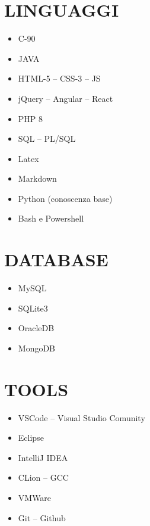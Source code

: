\documentclass{clean_cv}
\begin{document}
    \section{LINGUAGGI}
        \begin{multicols}{3}
            \begin{itemize}
                \item C-90
                \item JAVA
                \item HTML-5 -- CSS-3 -- JS
                \item jQuery -- Angular -- React
                \item PHP 8
                \item SQL -- PL/SQL
                \item Latex
                \item Markdown
                \item Python (conoscenza base)
                \item Bash e Powershell
            \end{itemize}
        \end{multicols}

    \section{DATABASE}
        \begin{multicols}{2}
            \begin{itemize}
                \item MySQL
                \item SQLite3
                \item OracleDB
                \item MongoDB
            \end{itemize}
        \end{multicols}

    \newpage

    \section{TOOLS}
        \begin{multicols}{2}
            \begin{itemize}
                \item VSCode -- Visual Studio Comunity
                \item Eclipse
                \item IntelliJ IDEA
                \item CLion -- GCC
                \item VMWare
                \item Git -- Github
            \end{itemize}
        \end{multicols}
    
\end{document}

